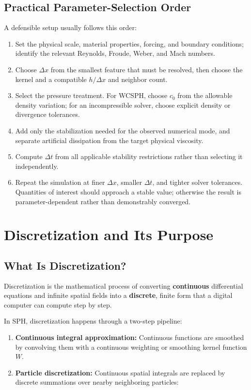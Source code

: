 \documentclass[11pt]{article}
\begin{document}
\subsection{Practical Parameter-Selection Order}

A defensible setup usually follows this order:

\begin{enumerate}
    \item Set the physical scale, material properties, forcing, and boundary
    conditions; identify the relevant Reynolds, Froude, Weber, and Mach
    numbers.
    \item Choose $\Delta x$ from the smallest feature that must be resolved,
    then choose the kernel and a compatible $h/\Delta x$ and neighbor count.
    \item Select the pressure treatment. For WCSPH, choose $c_0$ from the
    allowable density variation; for an incompressible solver, choose explicit
    density or divergence tolerances.
    \item Add only the stabilization needed for the observed numerical mode,
    and separate artificial dissipation from the target physical viscosity.
    \item Compute $\Delta t$ from all applicable stability restrictions rather
    than selecting it independently.
    \item Repeat the simulation at finer $\Delta x$, smaller $\Delta t$, and
    tighter solver tolerances. Quantities of interest should approach a stable
    value; otherwise the result is parameter-dependent rather than demonstrably
    converged.
\end{enumerate}

\section{Discretization and Its Purpose}

\subsection{What Is Discretization?}

Discretization is the mathematical process of converting \textbf{continuous}
differential equations and infinite spatial fields into a \textbf{discrete},
finite form that a digital computer can compute step by step.

In SPH, discretization happens through a two-step pipeline:

\begin{enumerate}
    \item \textbf{Continuous integral approximation:} Continuous functions are
    smoothed by convolving them with a continuous weighting or smoothing kernel
    function $W$.
    \item \textbf{Particle discretization:} Continuous spatial integrals are
    replaced by discrete summations over nearby neighboring particles:
\end{enumerate}
\end{document}
